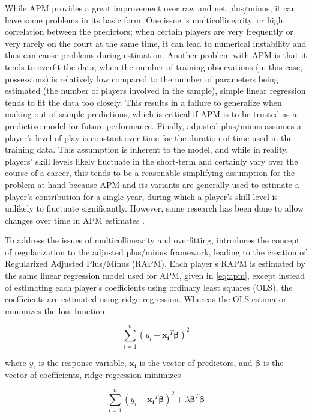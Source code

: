 While APM provides a great improvement over raw and net plus/minus, it can have some
problems in its basic form. One issue is multicollinearity, or high correlation
between the predictors; when certain players are very frequently or very rarely on
the court at the same time, it can lead to numerical instability and thus can cause
problems during estimation. Another problem with APM is that it tends to overfit the
data; when the number of training observations (in this case, possessions) is
relatively low compared to the number of parameters being estimated (the number of
players involved in the sample), simple linear regression tends to fit the data too
closely. This results in a failure to generalize when making out-of-sample
predictions, which is critical if APM is to be trusted as a predictive model
for future performance. Finally, adjusted plus/minus assumes a player's level of
play is constant over time for the duration of time used in the training data. This
assumption is inherent to the model, and while in reality, players' skill levels
likely fluctuate in the short-term and certainly vary over the course of a career,
this tends to be a reasonable simplifying assumption for the problem at hand because
APM and its variants are generally used to estimate a player's contribution for a
single year, during which a player's skill level is unlikely to fluctuate
significantly. However, some research has been done to allow changes over time in
APM estimates \cite{Fearnhead}.

To address the issues of multicollinearity and overfitting, \citet{Sill} introduces
the concept of regularization to the adjusted plus/minus framework, leading to the
creation of Regularized Adjusted Plus/Minus (RAPM). Each player’s RAPM is estimated
by the same linear regression model used for APM, given in \eqref{eq:apm}, except
instead of estimating each player’s coefficients using ordinary least squares (OLS),
the coefficients are estimated using ridge regression. Whereas the OLS estimator
minimizes the loss function

\begin{equation} \label{eq:ols_loss}
    \sum_{i=1}^n \left( y_i - \bm{x_i}^T\bm{\beta} \right)^2
\end{equation}

where $y_i$ is the response variable, $\bm{x_i}$ is the vector of predictors, and
$\bm{\beta}$ is the vector of coefficients, ridge regression minimizes

\begin{equation} \label{eq:ridge_loss}
    \sum_{i=1}^n \left( y_i - \bm{x_i}^T\bm{\beta} \right)^2 + \lambda
    \bm{\beta}^T\bm{\beta}
\end{equation}

